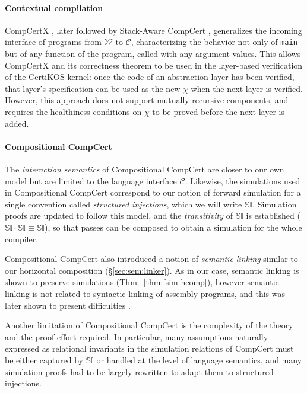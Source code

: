 \documentclass[sigplan,screen,review]{acmart}
\begin{document}
\paragraph{Contextual compilation} %

CompCertX \cite{popl15},
later followed by Stack-Aware CompCert \cite{stackaware},
generalizes
the incoming interface of programs
from $\mathcal{W}$ to $\mathcal{C}$,
characterizing the behavior
not only of \texttt{main}
but of any function of the program,
called with any argument values.
This allows CompCertX and its correctness theorem
to be used in the layer-based verification of
the CertiKOS kernel:
once the code of an abstraction layer has been verified,
that layer's specification can be used as the new $\chi$
when the next layer is verified.
However,
this approach does not support
mutually recursive components,
and requires the healthiness conditions on $\chi$
to be proved before the next layer is added.


\paragraph{Compositional CompCert} %

The \emph{interaction semantics} of
Compositional CompCert \cite{compcompcert}
are closer to our own model
but are limited to the language interface $\mathcal{C}$.
Likewise, the simulations used in Compositional CompCert
correspond to our notion of forward simulation
for a single convention called \emph{structured injections},
which we will write $\mathbb{SI}$.
Simulation proofs are updated to follow this model,
and the \emph{transitivity} of $\mathbb{SI}$ is established
($\mathbb{SI} \cdot \mathbb{SI} \equiv \mathbb{SI}$),
so that passes can be composed
to obtain a simulation for the whole compiler.

Compositional CompCert also introduced a notion of \emph{semantic linking}
similar to our horizontal composition
(\S\ref{sec:sem:linker}).
As in our case,
semantic linking is shown to preserve simulations
(Thm.~\ref{thm:fsim-hcomp}),
however semantic linking is not related to
syntactic linking of assembly programs,
and this was later shown to present difficulties \cite{compcertm}.

Another limitation of Compositional CompCert
is the complexity of the theory
and the proof effort required.
In particular,
many assumptions naturally expressed as
relational invariants in the simulation relations of CompCert
must be either captured by $\mathbb{SI}$
or handled at the level of language semantics,
and many simulation proofs
had to be largely rewritten to adapt them to
structured injections.
\end{document}
